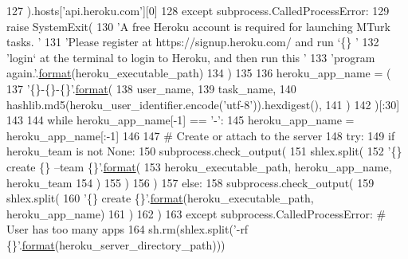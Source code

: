 \begin{DoxyCode}
127             ).hosts[\textcolor{stringliteral}{'api.heroku.com'}][0]
128         \textcolor{keywordflow}{except} subprocess.CalledProcessError:
129             \textcolor{keywordflow}{raise} SystemExit(
130                 \textcolor{stringliteral}{'A free Heroku account is required for launching MTurk tasks. '}
131                 \textcolor{stringliteral}{'Please register at https://signup.heroku.com/ and run `\{\} '}
132                 \textcolor{stringliteral}{'login` at the terminal to login to Heroku, and then run this '}
133                 \textcolor{stringliteral}{'program again.'}.\hyperlink{namespaceparlai_1_1chat__service_1_1services_1_1messenger_1_1shared__utils_a32e2e2022b824fbaf80c747160b52a76}{format}(heroku\_executable\_path)
134             )
135 
136     heroku\_app\_name = (
137         \textcolor{stringliteral}{'\{\}-\{\}-\{\}'}.\hyperlink{namespaceparlai_1_1chat__service_1_1services_1_1messenger_1_1shared__utils_a32e2e2022b824fbaf80c747160b52a76}{format}(
138             user\_name,
139             task\_name,
140             hashlib.md5(heroku\_user\_identifier.encode(\textcolor{stringliteral}{'utf-8'})).hexdigest(),
141         )
142     )[:30]
143 
144     \textcolor{keywordflow}{while} heroku\_app\_name[-1] == \textcolor{stringliteral}{'-'}:
145         heroku\_app\_name = heroku\_app\_name[:-1]
146 
147     \textcolor{comment}{# Create or attach to the server}
148     \textcolor{keywordflow}{try}:
149         \textcolor{keywordflow}{if} heroku\_team \textcolor{keywordflow}{is} \textcolor{keywordflow}{not} \textcolor{keywordtype}{None}:
150             subprocess.check\_output(
151                 shlex.split(
152                     \textcolor{stringliteral}{'\{\} create \{\} --team \{\}'}.\hyperlink{namespaceparlai_1_1chat__service_1_1services_1_1messenger_1_1shared__utils_a32e2e2022b824fbaf80c747160b52a76}{format}(
153                         heroku\_executable\_path, heroku\_app\_name, heroku\_team
154                     )
155                 )
156             )
157         \textcolor{keywordflow}{else}:
158             subprocess.check\_output(
159                 shlex.split(
160                     \textcolor{stringliteral}{'\{\} create \{\}'}.\hyperlink{namespaceparlai_1_1chat__service_1_1services_1_1messenger_1_1shared__utils_a32e2e2022b824fbaf80c747160b52a76}{format}(heroku\_executable\_path, heroku\_app\_name)
161                 )
162             )
163     \textcolor{keywordflow}{except} subprocess.CalledProcessError:  \textcolor{comment}{# User has too many apps}
164         sh.rm(shlex.split(\textcolor{stringliteral}{'-rf \{\}'}.\hyperlink{namespaceparlai_1_1chat__service_1_1services_1_1messenger_1_1shared__utils_a32e2e2022b824fbaf80c747160b52a76}{format}(heroku\_server\_directory\_path)))

\end{DoxyCode}

